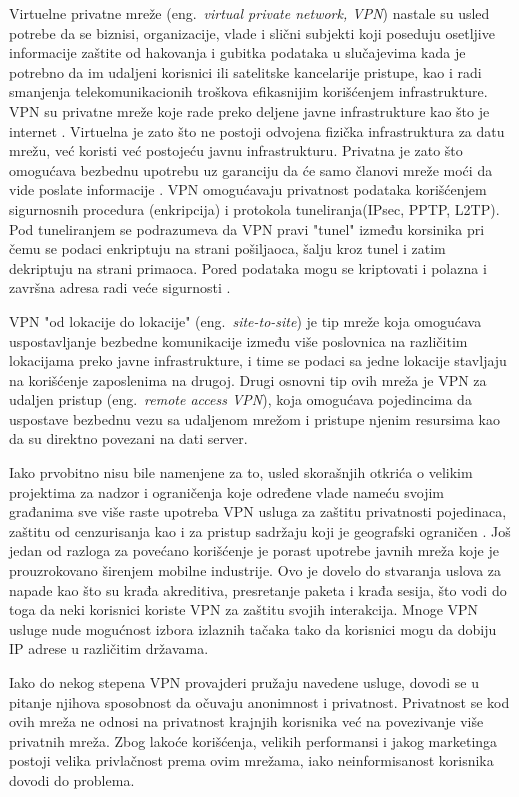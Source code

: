 \documentclass[a4paper]{article}
\begin{document}
Virtuelne privatne mreže (eng.~{\em virtual private network, VPN}) nastale su usled potrebe da se biznisi, organizacije, vlade i slični subjekti koji poseduju osetljive informacije zaštite od hakovanja i gubitka podataka u slučajevima kada je potrebno da im udaljeni korisnici ili satelitske kancelarije pristupe, kao i radi smanjenja telekomunikacionih troškova efikasnijim korišćenjem infrastrukture. VPN su privatne mreže koje rade preko deljene javne infrastrukture kao što je internet \cite{vpn2}. Virtuelna je zato što ne postoji odvojena fizička infrastruktura za datu mrežu, već koristi već postojeću javnu infrastrukturu. Privatna je zato što  omogućava bezbednu upotrebu uz garanciju da će samo članovi mreže moći da vide poslate informacije \cite{vpn3}. VPN omogućavaju privatnost podataka korišćenjem sigurnosnih procedura (enkripcija) i protokola tuneliranja(IPsec, PPTP, L2TP). Pod tuneliranjem se podrazumeva da VPN pravi "tunel" između korsinika pri čemu se podaci enkriptuju na strani pošiljaoca, šalju kroz tunel i zatim dekriptuju na strani primaoca. Pored podataka mogu se kriptovati i polazna i završna adresa radi veće sigurnosti \cite{vpn4}. 
\par VPN "od lokacije do lokacije" (eng.~{\em site-to-site}) je tip mreže koja omogućava uspostavljanje bezbedne komunikacije između više poslovnica na različitim lokacijama preko javne infrastrukture, i time se podaci sa jedne lokacije stavljaju na korišćenje zaposlenima na drugoj. Drugi osnovni tip ovih mreža je VPN za udaljen pristup (eng.~{\em remote access VPN}), koja omogućava pojedincima da uspostave bezbednu vezu sa udaljenom mrežom i pristupe njenim resursima kao da su direktno povezani na dati server. 
\par Iako prvobitno nisu bile namenjene za to, usled skorašnjih otkrića o velikim projektima za nadzor i ograničenja koje određene vlade nameću svojim građanima sve više raste upotreba VPN usluga za zaštitu privatnosti pojedinaca, zaštitu od cenzurisanja kao i za pristup sadržaju koji je geografski ograničen \cite{vpn5}. Još jedan od razloga za povećano korišćenje je porast upotrebe javnih mreža koje je prouzrokovano širenjem mobilne industrije. Ovo je dovelo do stvaranja uslova za napade kao što su krađa akreditiva, presretanje paketa i krađa sesija, što vodi do toga da neki korisnici koriste VPN za zaštitu svojih interakcija. Mnoge VPN usluge nude mogućnost izbora izlaznih tačaka tako da korisnici mogu da dobiju IP adrese u različitim državama.
\par Iako do nekog stepena VPN provajderi pružaju navedene usluge, dovodi se u pitanje njihova sposobnost da očuvaju anonimnost i privatnost. Privatnost se kod ovih mreža ne odnosi na privatnost krajnjih korisnika već na povezivanje više privatnih mreža. Zbog lakoće korišćenja, velikih performansi i jakog marketinga postoji velika privlačnost prema ovim mrežama, iako neinformisanost korisnika dovodi do problema.
\end{document}
